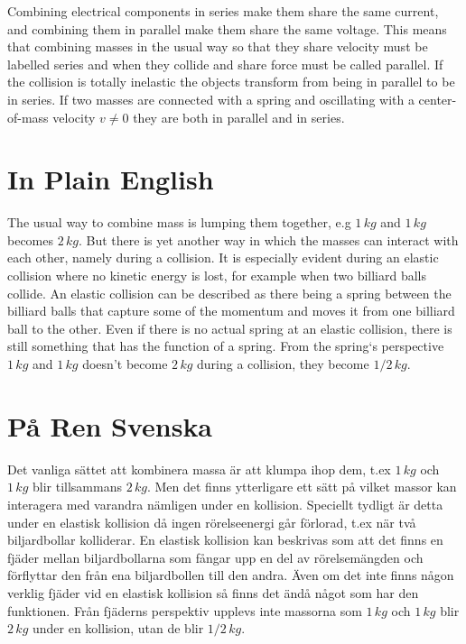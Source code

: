 \documentclass[]{../common/elementary-physics}
\begin{document}
Combining electrical components in series make them share the same current, and combining them in parallel make them share the same voltage.
This means that combining masses in the usual way so that they share velocity must be labelled series and when they collide and share force must be called parallel.
If the collision is totally inelastic the objects transform from being in parallel to be in series.
If two masses are connected with a spring and oscillating with a center-of-mass velocity $v \neq 0$ they are both in parallel and in series.

\appendix

\section{In Plain English}

The usual way to combine mass is lumping them together, e.g $1 \, kg$ and $1 \, kg$ becomes $2 \, kg$.
But there is yet another way in which the masses can interact with each other, namely during a collision.
It is especially evident during an elastic collision where no kinetic energy is lost, for example when two billiard balls collide.
An elastic collision can be described as there being a spring between the billiard balls that capture some of the momentum and moves it from one billiard ball to the other.
Even if there is no actual spring at an elastic collision, there is still something that has the function of a spring.
From the spring`s perspective $1 \, kg$ and $1 \, kg$ doesn’t become $2 \, kg$ during a collision, they become $1/2 \, kg$.

\section{På Ren Svenska}

Det vanliga sättet att kombinera massa är att klumpa ihop dem, t.ex $1 \, kg$ och $1 \, kg$ blir tillsammans $2 \, kg$.
Men det finns ytterligare ett sätt på vilket massor kan interagera med varandra nämligen under en kollision.
Speciellt tydligt är detta under en elastisk kollision då ingen rörelseenergi går förlorad, t.ex när två biljardbollar kolliderar.
En elastisk kollision kan beskrivas som att det finns en fjäder mellan biljardbollarna som fångar upp en del av rörelsemängden och förflyttar den från ena biljardbollen till den andra.
Även om det inte finns någon verklig fjäder vid en elastisk kollision så finns det ändå något som har den funktionen.
Från fjäderns perspektiv upplevs inte massorna som $1 \, kg$ och $1 \, kg$ blir $2 \, kg$ under en kollision, utan de blir $1/2 \, kg$.



\printbibliography
\end{document}
